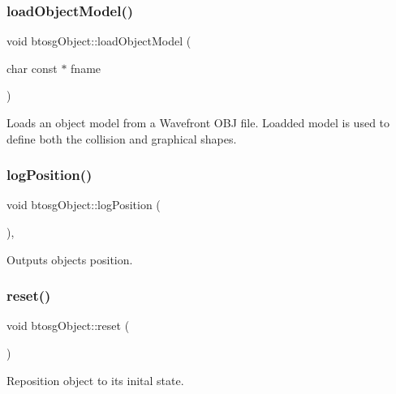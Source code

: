 \subsubsection{\texorpdfstring{loadObjectModel()}{loadObjectModel()}}
{\footnotesize\ttfamily void btosg\+Object\+::load\+Object\+Model (\begin{DoxyParamCaption}\item[{char const $\ast$}]{fname }\end{DoxyParamCaption})\hspace{0.3cm}{\ttfamily [inherited]}}

Loads an object model from a Wavefront O\+BJ file. Loadded model is used to define both the collision and graphical shapes. \mbox{\label{classbtosgObject_acfd70fa6477c80fd7f29ad7ab9f4f067}} 
\subsubsection{\texorpdfstring{logPosition()}{logPosition()}}
{\footnotesize\ttfamily void btosg\+Object\+::log\+Position (\begin{DoxyParamCaption}{ }\end{DoxyParamCaption})\hspace{0.3cm}{\ttfamily [inline]}, {\ttfamily [inherited]}}

Outputs object\textquotesingle{}s position. \mbox{\label{classbtosgObject_a93983f9180dd0672f8779cf2baa78580}} 
\subsubsection{\texorpdfstring{reset()}{reset()}}
{\footnotesize\ttfamily void btosg\+Object\+::reset (\begin{DoxyParamCaption}{ }\end{DoxyParamCaption})\hspace{0.3cm}{\ttfamily [inherited]}}

Reposition object to its inital state. \mbox{\label{classbtosgObject_ad1508a0ce28cfac83e5f0ff6245f91b5}} 
